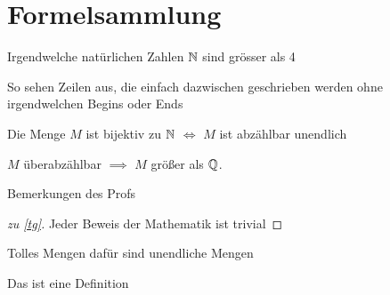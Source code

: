 \section{Formelsammlung}
\begin{lem}
	Irgendwelche natürlichen Zahlen $\mathbb{N}$ sind grösser als 4
\end{lem}

So sehen Zeilen aus, die einfach dazwischen geschrieben werden ohne irgendwelchen Begins oder Ends 

\begin{thm} \label{tg}%
	Die Menge $M$ ist bijektiv zu $\mathbb{N}$ $\iff$ $M$ ist abzählbar unendlich
\end{thm}

\begin{cor}
	$M$ überabzählbar $\implies$ $M$ größer als $\mathbb{Q}$.
\end{cor}

\begin{note}

	Bemerkungen des Profs

\end{note}

\begin{proof}[zu \ref{tg}]

Jeder Beweis der Mathematik ist trivial

\end{proof}

\begin{example}

	Tolles Mengen dafür sind unendliche Mengen

\end{example}
\begin{df}

Das ist eine Definition

\end{df}





